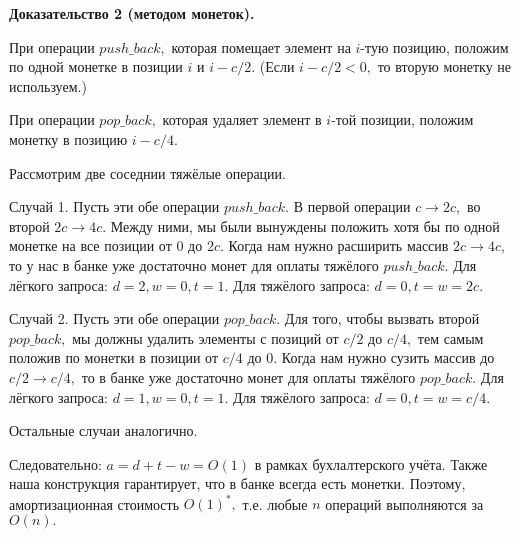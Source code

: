\textbf{Доказательство 2 (методом монеток).}

При операции $push\_back,$ которая помещает элемент на $i$-тую позицию, положим по одной монетке в позиции $i$ и $i-c/2.$ (Если $i-c/2 < 0,$ то вторую монетку не используем.)

При операции $pop\_back,$ которая удаляет элемент в $i$-той позиции, положим монетку в позицию $i-c/4.$

Рассмотрим две соседнии тяжёлые операции.

Случай 1. Пусть эти обе операции $push\_back.$ В первой операции $c\to 2c,$ во второй $2c\to 4c.$ Между ними, мы были вынуждены положить хотя бы по одной монетке на все позиции от $0$ до $2c.$ Когда нам нужно расширить массив $2c\to 4c$, то у нас в банке уже достаточно монет для оплаты тяжёлого $push\_back.$ Для лёгкого запроса: $d=2, w=0, t=1.$ Для тяжёлого запроса: $d=0, t=w=2c.$

Случай 2. Пусть эти обе операции $pop\_back.$ Для того, чтобы вызвать второй $pop\_back,$ мы должны удалить элементы с позиций от $c/2$ до $c/4,$ тем самым положив по монетки в позиции от $c/4$ до $0.$ Когда нам нужно сузить массив до $c/2\to c/4,$ то в банке уже достаточно монет для оплаты тяжёлого $pop\_back.$ Для лёгкого запроса: $d=1, w=0, t=1.$ Для тяжёлого запроса: $d=0, t=w=c/4.$

Остальные случаи аналогично.

Следовательно: $a=d+t-w=O(1)$ в рамках бухлалтерского учёта. Также наша конструкция гарантирует, что в банке всегда есть монетки. Поэтому, амортизационная стоимость $O(1)^*,$ т.е. любые $n$ операций выполняются за $O(n).$